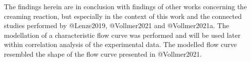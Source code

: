 \documentclass[
]{article}
\begin{document}
The findings herein are in conclusion with findings of other works
concerning the creaming reaction, but especially in the context of this
work and the connected studies performed by @Lenze2019, @Vollmer2021 and
@Vollmer2021a. The modellation of a characteristic flow curve was
performed and will be used later within correlation analysis of the
experimental data. The modelled flow curve resembled the shape of the
flow curve presented in @Vollmer2021.
\end{document}
